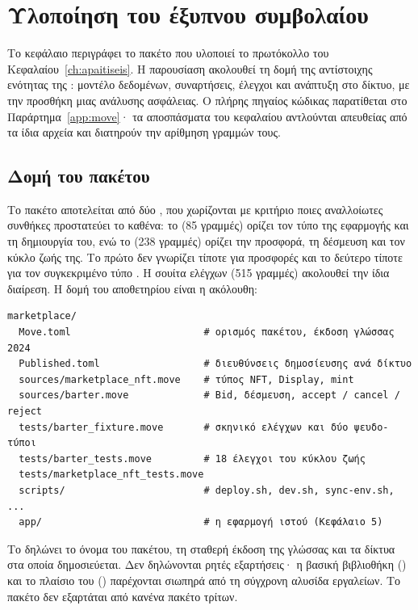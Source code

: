 \chapter{Υλοποίηση του έξυπνου συμβολαίου}
\label{ch:contract}

Το κεφάλαιο περιγράφει το πακέτο  που υλοποιεί το πρωτόκολλο του
Κεφαλαίου~\ref{ch:apaitiseis}. Η παρουσίαση ακολουθεί τη δομή της αντίστοιχης ενότητας της
\cite{hadjichristofi2022}: μοντέλο δεδομένων, συναρτήσεις, έλεγχοι και ανάπτυξη στο δίκτυο,
με την προσθήκη μιας ανάλυσης ασφάλειας. Ο πλήρης πηγαίος κώδικας παρατίθεται στο
Παράρτημα~\ref{app:move}· τα αποσπάσματα του κεφαλαίου αντλούνται απευθείας από τα ίδια
αρχεία και διατηρούν την αρίθμηση γραμμών τους.

\section{Δομή του πακέτου}
\label{sec:package}

Το πακέτο  αποτελείται από δύο , που χωρίζονται με κριτήριο
ποιες αναλλοίωτες συνθήκες προστατεύει το καθένα: το  (85 γραμμές)
ορίζει τον τύπο  της εφαρμογής και τη δημιουργία του, ενώ το 
(238 γραμμές) ορίζει την προσφορά, τη δέσμευση και τον κύκλο ζωής της. Το πρώτο δεν
γνωρίζει τίποτε για προσφορές και το δεύτερο τίποτε για τον συγκεκριμένο τύπο .
Η σουίτα ελέγχων (515 γραμμές) ακολουθεί την ίδια διαίρεση. Η δομή του αποθετηρίου είναι η
ακόλουθη:

\begin{lstlisting}[numbers=none,caption={Δομή του αποθετηρίου},label={lst:tree}]
marketplace/
  Move.toml                       # ορισμός πακέτου, έκδοση γλώσσας 2024
  Published.toml                  # διευθύνσεις δημοσίευσης ανά δίκτυο
  sources/marketplace_nft.move    # τύπος NFT, Display, mint
  sources/barter.move             # Bid, δέσμευση, accept / cancel / reject
  tests/barter_fixture.move       # σκηνικό ελέγχων και δύο ψευδο-τύποι
  tests/barter_tests.move         # 18 έλεγχοι του κύκλου ζωής
  tests/marketplace_nft_tests.move
  scripts/                        # deploy.sh, dev.sh, sync-env.sh, ...
  app/                            # η εφαρμογή ιστού (Κεφάλαιο 5)
\end{lstlisting}

Το  δηλώνει το όνομα του πακέτου, τη σταθερή έκδοση  της γλώσσας
και τα δίκτυα στα οποία δημοσιεύεται. Δεν δηλώνονται ρητές εξαρτήσεις· η βασική βιβλιοθήκη
() και το πλαίσιο του  () παρέχονται σιωπηρά από τη
σύγχρονη αλυσίδα εργαλείων. Το πακέτο δεν εξαρτάται από κανένα πακέτο τρίτων.

